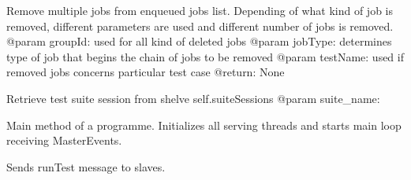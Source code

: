 \documentclass[a4paper,11pt,openany]{sphinxmanual}
\begin{document}
\begin{fulllineitems}

\begin{fulllineitems}
\label{ref-manual/XrdTestMaster:XrdTestMaster.XrdTestMaster.removeJobs}
Remove multiple jobs from enqueued jobs list. Depending of what kind of
job is removed, different parameters are used and different number of
jobs is removed.
@param groupId: used for all kind of deleted jobs
@param jobType: determines type of job that begins the chain of
jobs to be removed
@param testName: used if removed jobs concerns particular test case
@return: None

\end{fulllineitems}


\begin{fulllineitems}
\label{ref-manual/XrdTestMaster:XrdTestMaster.XrdTestMaster.retrieveAllSuiteSessions}
\end{fulllineitems}


\begin{fulllineitems}
\label{ref-manual/XrdTestMaster:XrdTestMaster.XrdTestMaster.retrieveSuiteSession}
Retrieve test suite session from shelve self.suiteSessions
@param suite\_name:

\end{fulllineitems}


\begin{fulllineitems}
\label{ref-manual/XrdTestMaster:XrdTestMaster.XrdTestMaster.run}
Main method of a programme. Initializes all serving threads and starts
main loop receiving MasterEvents.

\end{fulllineitems}


\begin{fulllineitems}
\label{ref-manual/XrdTestMaster:XrdTestMaster.XrdTestMaster.runTestCase}
Sends runTest message to slaves.


\end{fulllineitems}
\end{fulllineitems}
\end{document}
